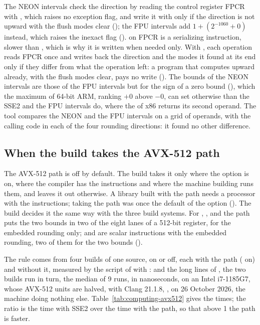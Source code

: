 \documentclass[12pt,a4paper,twoside,openright]{book}
\begin{document}
\medskip
The NEON intervals check the direction by reading the control register FPCR
with , which raises no exception flag, and write it with
 only if the direction is not upward with the flush modes clear
(); the FPU intervals add $1+(2^{-1060}+0)$ instead, which
raises the inexact flag ().  on FPCR is a
serializing instruction, slower than , which is why it is written
when needed only. With , each operation
reads FPCR once and writes back the direction and the modes it found at its
end only if they differ from what the operation left: a program that
computes upward already, with the flush modes clear, pays no write
(). The bounds of the NEON intervals are those
of the FPU intervals but for the sign of a zero bound (),
which the maximum of 64-bit ARM, ranking $+0$ above $-0$, can set otherwise
than the SSE2 and the FPU intervals do, where the  of x86
returns its second operand. The tool  compares the
NEON and the FPU intervals on a grid of operands, with the calling code in
each of the four rounding directions: it found no other difference.

\subsection{When the build takes the AVX-512 path}
\label{sec:computing-avx512-rule}
%

The AVX-512 path is off by default. The build takes it only where the
option  is on, where the compiler has the
instructions and where the machine building runs them, and leaves it out
otherwise. A library built with the path needs a processor with the instructions;
taking the path was once the default of the option 
(). The
build decides it the same way with the three build
systems.\newinvfive{} For \code{+}, \code{-}, \code{*} and  the
path puts the two bounds in two of the eight lanes of a 512-bit register,
for the embedded rounding only; \code{/} and  are scalar
instructions with the embedded rounding, two of them for the two bounds
().

\medskip
The rule comes from four builds of one source, 
on or off, each with the path ( on) and without
it, measured by the script  of 
with :  and the long lines of
, the two builds run in turn, the median
of 9 runs, in nanoseconds, on an Intel i7-1185G7, whose AVX-512 units are
halved, with Clang 21.1.8, , on 26 October 2026, the
machine doing nothing else. Table~\ref{tab:computing-avx512} gives the
times; the ratio is the time with SSE2 over the time with the path, so that
above 1 the path is faster.
\end{document}
